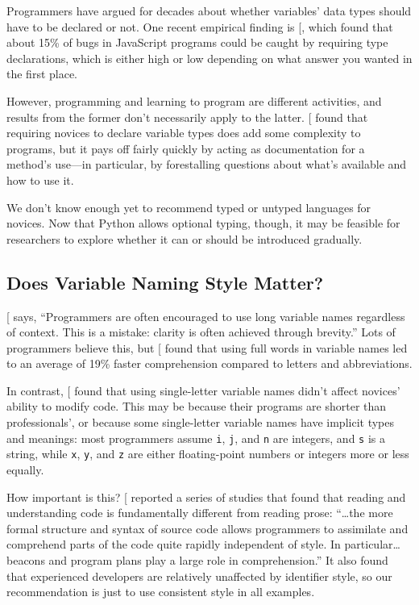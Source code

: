Programmers have argued for decades about whether variables' data types
should have to be declared or not. One recent empirical finding is
{[}\protect[\hyperlink{b:Gao2017}{Gao2017}]{]}, which found that about 15\% of bugs in JavaScript
programs could be caught by requiring type declarations, which is either
high or low depending on what answer you wanted in the first place.

However, programming and learning to program are different activities,
and results from the former don't necessarily apply to the latter.
{[}\protect[\hyperlink{b:Endr2014}{Endr2014}]{]} found that requiring novices to declare variable
types does add some complexity to programs, but it pays off fairly
quickly by acting as documentation for a method's use---in particular, by
forestalling questions about what's available and how to use it.

We don't know enough yet to recommend typed or untyped languages for
novices. Now that Python allows optional typing, though, it may be
feasible for researchers to explore whether it can or should be
introduced gradually.

\subsection{Does Variable Naming Style Matter?}\label{does-variable-naming-style-matter}

{[}\protect[\hyperlink{b:Kern1999}{Kern1999}]{]} says, ``Programmers are often encouraged to use long
variable names regardless of context. This is a mistake: clarity is
often achieved through brevity.'' Lots of programmers believe this, but
{[}\protect[\hyperlink{b:Hofm2017}{Hofm2017}]{]} found that using full words in variable names led to
an average of 19\% faster comprehension compared to letters and
abbreviations.

In contrast, {[}\protect[\hyperlink{b:Beni2017}{Beni2017}]{]} found that using single-letter variable
names didn't affect novices' ability to modify code. This may be because
their programs are shorter than professionals', or because some
single-letter variable names have implicit types and meanings: most
programmers assume \texttt{i}, \texttt{j}, and \texttt{n} are integers, and \texttt{s} is a string,
while \texttt{x}, \texttt{y}, and \texttt{z} are either floating-point numbers or integers
more or less equally.

How important is this? {[}\protect[\hyperlink{b:Bink2012}{Bink2012}]{]} reported a series of studies
that found that reading and understanding code is fundamentally
different from reading prose: ``\ldots{}the more formal structure
and syntax of source code allows programmers to assimilate and
comprehend parts of the code quite rapidly independent of style. In
particular\ldots{}beacons and program plans play a large role in
comprehension.'' It also found that experienced developers are relatively
unaffected by identifier style, so our recommendation is just to use
consistent style in all examples.

